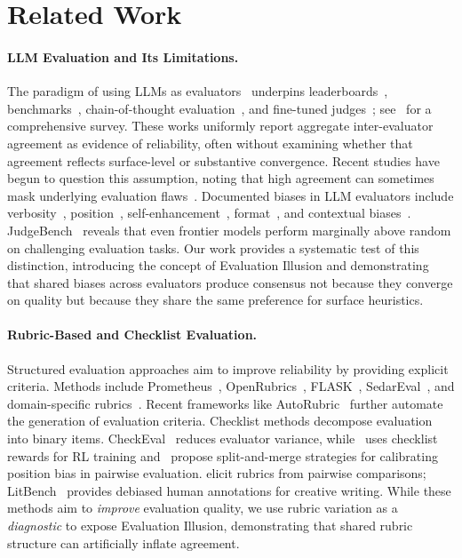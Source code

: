 \documentclass{article}
\begin{document}
\section{Related Work}

\paragraph{LLM Evaluation and Its Limitations.}
The paradigm of using LLMs as evaluators~\citep{zheng2023judging} underpins leaderboards~\citep{chiang2024chatbot}, benchmarks~\citep{li2023alpacaeval, li2024arenahard}, chain-of-thought evaluation~\citep{liu2023geval}, and fine-tuned judges~\citep{zhu2025judgelm}; see~\citet{li2024generation} for a comprehensive survey. These works uniformly report aggregate inter-evaluator agreement as evidence of reliability, often without examining whether that agreement reflects surface-level or substantive convergence. Recent studies have begun to question this assumption, noting that high agreement can sometimes mask underlying evaluation flaws~\citep{wang2023large}. Documented biases in LLM evaluators include verbosity~\citep{zheng2023judging}, position~\citep{wang2023large}, self-enhancement~\citep{wataoka2024self}, format~\citep{li2024generation}, and contextual biases~\citep{li2025curse}. JudgeBench~\citep{tan2025judgebench} reveals that even frontier models perform marginally above random on challenging evaluation tasks. Our work provides a systematic test of this distinction, introducing the concept of Evaluation Illusion and demonstrating that shared biases across evaluators produce consensus not because they converge on quality but because they share the same preference for surface heuristics.

\paragraph{Rubric-Based and Checklist Evaluation.}
Structured evaluation approaches aim to improve reliability by providing explicit criteria. Methods include Prometheus~\citep{kim2024prometheus, kim2024prometheus2}, OpenRubrics~\citep{liu2025openrubrics}, FLASK~\citep{ye2024flask}, SedarEval~\citep{fan2025sedareval}, and domain-specific rubrics~\citep{pathak2025rubric}. Recent frameworks like AutoRubric~\citep{rao2026autorubric} further automate the generation of evaluation criteria. Checklist methods decompose evaluation into binary items. CheckEval~\citep{lee2025checkeval} reduces evaluator variance, while~\citet{zhang2025cm2} uses checklist rewards for RL training and~\citet{li2024split} propose split-and-merge strategies for calibrating position bias in pairwise evaluation. \citet{rezaei2025online} elicit rubrics from pairwise comparisons; LitBench~\citep{fein2025litbench} provides debiased human annotations for creative writing. While these methods aim to \textit{improve} evaluation quality, we use rubric variation as a \textit{diagnostic} to expose Evaluation Illusion, demonstrating that shared rubric structure can artificially inflate agreement.
\end{document}
